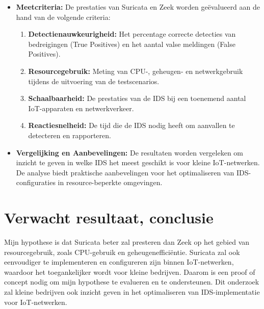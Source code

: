 \begin{itemize}
    
    \item \textbf{Meetcriteria:} De prestaties van Suricata en Zeek worden geëvalueerd aan de hand van de volgende criteria:
    \begin{enumerate}
        \item \textbf{Detectienauwkeurigheid:} Het percentage correcte detecties van bedreigingen (True Positives) en het aantal valse meldingen (False Positives).
        \item \textbf{Resourcegebruik:} Meting van CPU-, geheugen- en netwerkgebruik tijdens de uitvoering van de testscenarios.
        \item \textbf{Schaalbaarheid:} De prestaties van de IDS bij een toenemend aantal IoT-apparaten en netwerkverkeer.
        \item \textbf{Reactiesnelheid:} De tijd die de IDS nodig heeft om aanvallen te detecteren en rapporteren.
    \end{enumerate}
    

    
    \item \textbf{Vergelijking en Aanbevelingen:} De resultaten worden vergeleken om inzicht te geven in welke IDS het meest geschikt is voor kleine IoT-netwerken. De analyse biedt praktische aanbevelingen voor het optimaliseren van IDS-configuraties in resource-beperkte omgevingen.
\end{itemize}


\section{Verwacht resultaat, conclusie}%
\label{sec:verwachte_resultaten}

Mijn hypothese is dat Suricata beter zal presteren dan Zeek op het gebied van resourcegebruik, zoals CPU-gebruik en geheugenefficiëntie. Suricata zal ook eenvoudiger te implementeren en configureren zijn binnen IoT-netwerken, waardoor het toegankelijker wordt voor kleine bedrijven. Daarom is een proof of concept nodig om mijn hypothese te evalueren en te ondersteunen. Dit onderzoek zal kleine bedrijven ook inzicht geven in het optimaliseren van IDS-implementatie voor IoT-netwerken. 




